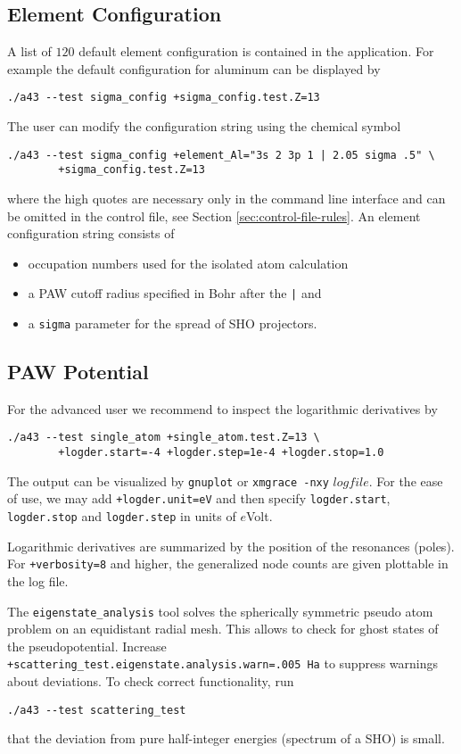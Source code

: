 \documentclass[oribibl]{llncs}
\newcommand{\ttt}[1]{\texttt{#1}}
\begin{document}
\subsection{Element Configuration} \label{sec:sigma-config-short}
%
A list of $120$ default element configuration is contained in the application.
For example the default configuration for aluminum can be displayed by
\begin{verbatim}
./a43 --test sigma_config +sigma_config.test.Z=13
\end{verbatim}
The user can modify the configuration string using the chemical symbol
\begin{verbatim}
./a43 --test sigma_config +element_Al="3s 2 3p 1 | 2.05 sigma .5" \
 		+sigma_config.test.Z=13
\end{verbatim}
where the high quotes are necessary only in the command line interface
and can be omitted in the control file, see Section \ref{sec:control-file-rules}.
%
\noindent
An element configuration string consists of
\begin{itemize}
	\item occupation numbers used for the isolated atom calculation
	\item a \ac{PAW} cutoff radius specified in Bohr after the \ttt{|} and
	\item a \ttt{sigma} parameter for the spread of \ac{SHO} projectors.
\end{itemize}

\subsection{PAW Potential} \label{sec:single-atom}
%
For the advanced user we recommend to inspect the logarithmic derivatives by
\begin{verbatim}
./a43 --test single_atom +single_atom.test.Z=13 \
        +logder.start=-4 +logder.step=1e-4 +logder.stop=1.0
\end{verbatim}
The output can be visualized by \ttt{gnuplot} or \ttt{xmgrace -nxy} $logfile$.
%
\noindent
For the ease of use, we may add \ttt{+logder.unit=eV} and then specify
\ttt{logder.start}, \ttt{logder.stop} and \ttt{logder.step} in units of $e$Volt.

\noindent
Logarithmic derivatives are summarized by the position of the resonances (poles).
For \ttt{+verbosity=8} and higher, the generalized node counts are given plottable in the log file.

\noindent
The \ttt{eigenstate\_analysis} tool solves the spherically symmetric pseudo atom
problem on an equidistant radial mesh. This allows to check for ghost states of the pseudopotential.
Increase \ttt{+scattering\_test.eigenstate.analysis.warn=.005 Ha} to suppress warnings about deviations.
To check correct functionality, run
\begin{verbatim}
./a43 --test scattering_test
\end{verbatim}
that the deviation from pure half-integer energies (spectrum of a \ac{SHO}) is small.
\end{document}
